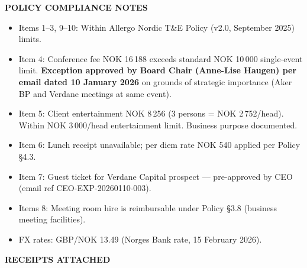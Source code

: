 \documentclass[a4paper,11pt]{article}
\begin{document}
\vspace{14pt}

\noindent\textbf{\textcolor{brand}{POLICY COMPLIANCE NOTES}}

\begin{itemize}[leftmargin=*, itemsep=2pt]
  \item Items 1--3, 9--10: Within Allergo Nordic T\&E Policy (v2.0, September 2025) limits.
  \item Item 4: Conference fee NOK 16\,188 exceeds standard NOK 10\,000 single-event limit.
    \textbf{Exception approved by Board Chair (Anne-Lise Haugen) per email dated 10 January 2026}
    on grounds of strategic importance (Aker BP and Verdane meetings at same event).
  \item Item 5: Client entertainment NOK 8\,256 (3 persons = NOK 2\,752/head).
    Within NOK 3\,000/head entertainment limit. Business purpose documented.
  \item Item 6: Lunch receipt unavailable; per diem rate NOK 540 applied per Policy \S 4.3.
  \item Item 7: Guest ticket for Verdane Capital prospect — pre-approved by CEO
    (email ref CEO-EXP-20260110-003).
  \item Items 8: Meeting room hire is reimbursable under Policy \S 3.8 (business meeting facilities).
  \item FX rates: GBP/NOK 13.49 (Norges Bank rate, 15 February 2026).
\end{itemize}

\vspace{14pt}

\noindent\textbf{\textcolor{brand}{RECEIPTS ATTACHED}}
\end{document}
